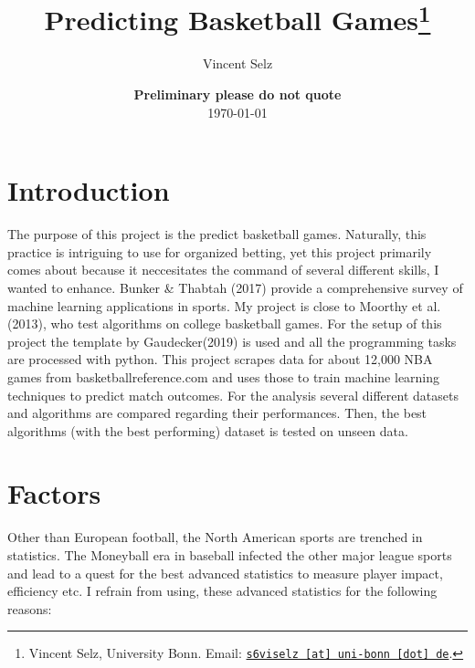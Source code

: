 \documentclass[11pt,a4paper,leqno]{article}
\begin{document}
\title{Predicting Basketball Games\thanks{Vincent Selz, University Bonn. Email: \href{mailto:s6viselz@uni-bonn.de}{\nolinkurl{s6viselz [at] uni-bonn [dot] de}}.}}

\author{Vincent Selz}

\date{
{\bf Preliminary \-\- please do not quote}
\\[1ex]
\today
}

\maketitle


\clearpage
\section{Introduction}

The purpose of this project is the predict basketball games. Naturally, this practice is intriguing to use for organized betting, yet this project primarily comes about because it neccesitates the command of several different skills, I wanted to enhance. Bunker \& Thabtah (2017) provide a comprehensive survey of machine learning applications in sports. My project is close to Moorthy et al.(2013), who test algorithms on college basketball games. For the setup of this project the template by Gaudecker(2019) is used and all the programming tasks are processed with python. This project scrapes data for about 12,000 NBA games from basketball\-reference.com and uses those to train machine learning techniques to predict match outcomes. For the analysis several different datasets and algorithms are compared regarding their performances. Then, the best algorithms (with the best performing) dataset is tested on unseen data.


\section{Factors}


Other than European football, the North American sports are trenched in statistics. The Moneyball era in baseball infected the other major league sports and lead to a quest for the best advanced statistics to measure player impact, efficiency etc. I refrain from using, these advanced statistics for the following reasons:
\end{document}
